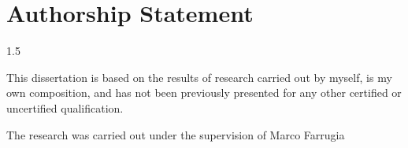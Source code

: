 \newpage

\chapter*{\centering Authorship Statement}
\vspace{-0.2in}

\begin{spacing}{1.5}
\setlength{\parskip}{0.3in}
\setlength{\parindent}{0in}


This dissertation is based on the results of research carried out by myself, is my
own composition, and has not been previously presented for any other certified
or uncertified qualification.

The research was carried out under the supervision of Marco Farrugia

\vspace{2.5cm}

\begin{center}
	\makebox[4cm]{\dotfill}  \hfill \makebox[4cm]{\dotfill}\\
	      \hfill {}
\end{center}
\end{spacing}
\newpage
